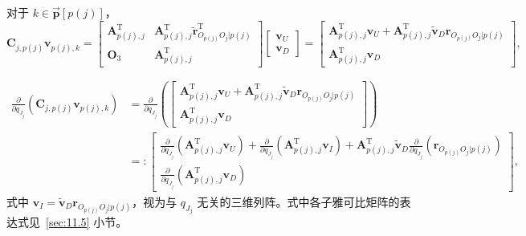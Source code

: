 对于 $k \in \vec{\boldsymbol{p}}[p(j)]$，
\begin{equation}\label{eq:11.12}
\boldsymbol{C}_{j,p(j)} \boldsymbol{v}_{p(j),k} =
\begin{bmatrix}
\boldsymbol{A}_{p(j),j}^{\mathrm{T}} & \boldsymbol{A}_{p(j),j}^{\mathrm{T}} \tilde{\boldsymbol{r}}_{O_{p(j)}O_j|p(j)}^{\mathrm{T}} \\[4pt]
\boldsymbol{O}_3 & \boldsymbol{A}_{p(j),j}^{\mathrm{T}}
\end{bmatrix}
\begin{bmatrix}
\boldsymbol{v}_U \\[4pt]
\boldsymbol{v}_D
\end{bmatrix}
=
\begin{bmatrix}
\boldsymbol{A}_{p(j),j}^{\mathrm{T}} \boldsymbol{v}_U + \boldsymbol{A}_{p(j),j}^{\mathrm{T}} \tilde{\boldsymbol{v}}_D \boldsymbol{r}_{O_{p(j)}O_j|p(j)} \\[4pt]
\boldsymbol{A}_{p(j),j}^{\mathrm{T}} \boldsymbol{v}_D
\end{bmatrix},
\end{equation}

\begin{equation}\label{eq:11.13}
\begin{aligned}
\frac{\partial}{\partial q_{J_j}} \left( \boldsymbol{C}_{j,p(j)} \boldsymbol{v}_{p(j),k} \right)
&= \frac{\partial}{\partial q_{J_j}} \left(
\begin{bmatrix}
\boldsymbol{A}_{p(j),j}^{\mathrm{T}} \boldsymbol{v}_U + \boldsymbol{A}_{p(j),j}^{\mathrm{T}} \tilde{\boldsymbol{v}}_D \boldsymbol{r}_{O_{p(j)}O_j|p(j)} \\[4pt]
\boldsymbol{A}_{p(j),j}^{\mathrm{T}} \boldsymbol{v}_D
\end{bmatrix}
\right) \\
&=:
\begin{bmatrix}
\displaystyle \frac{\partial}{\partial q_{J_j}} \left( \boldsymbol{A}_{p(j),j}^{\mathrm{T}} \boldsymbol{v}_U \right) + \frac{\partial}{\partial q_{J_j}} \left( \boldsymbol{A}_{p(j),j}^{\mathrm{T}} \boldsymbol{v}_I \right) + \boldsymbol{A}_{p(j),j}^{\mathrm{T}} \tilde{\boldsymbol{v}}_D \frac{\partial}{\partial q_{J_j}} \left( \boldsymbol{r}_{O_{p(j)}O_j|p(j)} \right) \\[12pt]
\displaystyle \frac{\partial}{\partial q_{J_j}} \left( \boldsymbol{A}_{p(j),j}^{\mathrm{T}} \boldsymbol{v}_D \right)
\end{bmatrix},
\end{aligned}
\end{equation}
式中 $\boldsymbol{v}_I = \tilde{\boldsymbol{v}}_D \boldsymbol{r}_{O_{p(j)}O_j|p(j)}$，视为与 $q_{J_j}$ 无关的三维列阵。式中各子雅可比矩阵的表达式见~\ref{sec:11.5} 小节。

